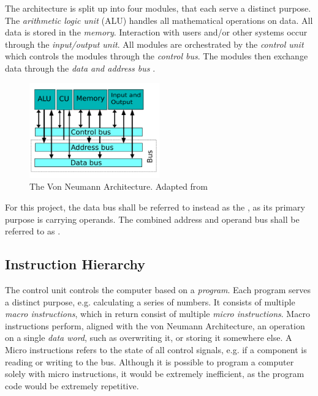 The architecture is split up into four modules, that each serve a distinct purpose. The \textit{arithmetic logic unit} (ALU) handles all mathematical operations on data. All data is stored in the \textit{memory}. Interaction with users and/or other systems occur through the \textit{input/output unit}. All modules are orchestrated by the \textit{control unit} which controls the modules through the \textit{control bus}. The modules then exchange data through the \textit{data and address bus} \cite{vonneumann1} \cite{vonneumann2}.

\begin{figure}[H]
  \begin{center}
    \includegraphics[width=0.5\textwidth]{figures/VNA}
  \end{center}
  \caption{The Von Neumann Architecture. Adapted from \cite{fig-vna}}\label{fig:vna}
\end{figure}

For this project, the data bus shall be referred to instead as the \cite{operand bus}, as its primary purpose is carrying operands. The combined address and operand bus shall be referred to as \cite{data bus}.

\subsection{Instruction Hierarchy}
The control unit controls the computer based on a \textit{program}. Each program serves a distinct purpose, e.g. calculating a series of numbers. It consists of multiple \textit{macro instructions}, which in return consist of multiple \textit{micro instructions}. Macro instructions perform, aligned with the von Neumann Architecture, an operation on a single \textit{data word}, such as overwriting it, or storing it somewhere else. A Micro instructions refers to the state of all control signals, e.g. if a component is reading or writing to the bus. Although it is possible to program a computer solely with micro instructions, it would be extremely inefficient, as the program code would be extremely repetitive. \cite{malvino1983a}


